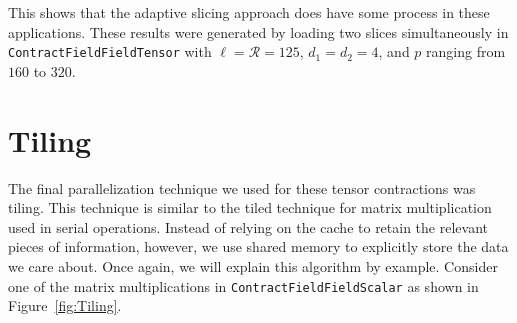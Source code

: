 This shows that the adaptive slicing approach does have some process in these applications. These results were generated by loading two slices simultaneously in \texttt{ContractFieldFieldTensor} with $\ell = \mathcal{R} = 125$, $d_1 = d_2 = 4$, and $p$ ranging from $160$ to $320$.

\section{Tiling}\label{sec:tiling}

The final parallelization technique we used for these tensor contractions was
tiling. This technique is similar to the tiled technique for matrix
multiplication used in serial operations. Instead of relying on the cache to
retain the relevant pieces of information, however, we use shared memory to
explicitly store the data we care about. Once again, we will explain this
algorithm by example. Consider one of the matrix multiplications in
\texttt{ContractFieldFieldScalar} as shown in Figure~\ref{fig:Tiling}. 


